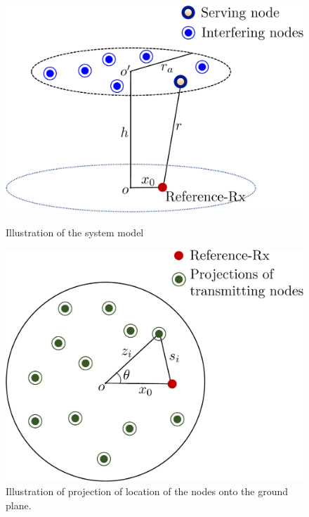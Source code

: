 \documentclass[journal,draftclsnofoot,onecolumn,12pt]{IEEEtran}
\begin{document}
\begin{figure}
\centering
\begin{minipage}{.5\textwidth}
\centering
\includegraphics[scale=0.3]{./sysmod1c}
\caption{Illustration of the system model}
\label{fig:sysmod1}
\end{minipage}%
\begin{minipage}{.5\textwidth}
\centering
\includegraphics[scale=0.3]{./sysmod2c}
\caption{Illustration of projection of location of the nodes onto the ground plane.}
\label{fig:sysmod2}
\end{minipage}
\end{figure}
\end{document}
